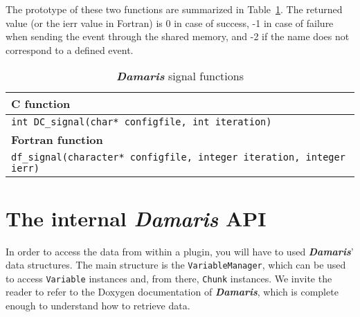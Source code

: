 \documentclass[11pt]{report}
\newcommand{\Damaris}{\emph{\textbf{Damaris}}}
\newcommand{\function}[1]{\texttt{#1}}
\begin{document}
\noindent\begin{minipage}{\textwidth}
\vspace{0.5cm}

\end{minipage}

\noindent\begin{minipage}{\textwidth}

\end{minipage}

The prototype of these two functions are summarized in Table~\ref{tab:signalFunctions}. The returned
value (or the ierr value in Fortran) is 0 in case of success, -1 in case of failure when sending the
event through the shared memory, and -2 if the name does not correspond to a defined event.

\begin{table}[h]
\centering
\begin{tabular}{|l|}
	\hline
   \textbf{C function} \\
   \hline
   \hline
   \function{int DC\_signal(char* configfile, int iteration)}  \\
   \hline
   \hline
   \textbf{Fortran function} \\
   \hline
   \hline
   \function{df\_signal(character* configfile, integer iteration, integer ierr)} \\
   \hline
\end{tabular}\caption{\Damaris{} signal functions}\label{tab:signalFunctions}
\end{table}

\section{The internal \Damaris{} API}\label{sec:internalAPI}

In order to access the data from within a plugin, you will have to used \Damaris{}' data structures.
The main structure is the \texttt{VariableManager}, which can be used to access \texttt{Variable} instances
and, from there, \texttt{Chunk} instances. We invite the reader to refer to the Doxygen documentation of
\Damaris{}, which is complete enough to understand how to retrieve data.
\end{document}
